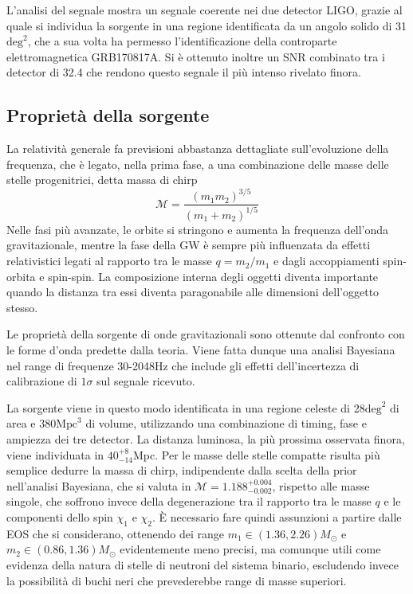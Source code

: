 L'analisi del segnale mostra un segnale coerente nei due detector LIGO, grazie al quale si individua la sorgente in una regione identificata da un angolo solido di 31 $\text{deg}^2$, che a sua volta ha permesso l'identificazione della controparte elettromagnetica GRB170817A. 
Si è ottenuto inoltre un SNR combinato tra i detector di 32.4 che rendono questo segnale il più intenso rivelato finora.\cite{Abbott_2017b}

\subsection{Proprietà della sorgente}
\label{subsection:proprietàSorgGW170817}
La relatività generale fa previsioni abbastanza dettagliate sull'evoluzione della frequenza, che è legato, nella prima fase, a una combinazione delle masse delle stelle progenitrici, detta massa di chirp 
\begin{equation}
	\mathcal{M} = \frac{(m_1m_2)^{3/5}}{(m_1+m_2)^{1/5}}
	\label{eqn:chirpmass}
\end{equation}
Nelle fasi più avanzate, le orbite si stringono e aumenta la frequenza dell'onda gravitazionale, mentre la fase della GW è sempre più influenzata da effetti relativistici legati al rapporto tra le masse $q = m_2/m_1$ e dagli accoppiamenti spin-orbita e spin-spin. 
La composizione interna degli oggetti diventa importante quando la distanza tra essi diventa paragonabile alle dimensioni dell'oggetto stesso. 

Le proprietà della sorgente di onde gravitazionali sono ottenute dal confronto con le forme d'onda predette dalla teoria. Viene fatta dunque una analisi Bayesiana nel range di frequenze 30-2048Hz che include gli effetti dell'incertezza di calibrazione di $1\sigma$ sul segnale ricevuto.

La sorgente viene in questo modo identificata in una regione celeste di 28$\text{deg}^2$ di area e $380\text{Mpc}^3$ di volume, utilizzando una combinazione di timing, fase e ampiezza dei tre detector. La distanza luminosa, la più prossima osservata finora, viene individuata in $40_{-14}^{+8}$Mpc. Per le masse delle stelle compatte risulta più semplice dedurre la massa di chirp, indipendente dalla scelta della prior nell'analisi Bayesiana, che si valuta in $\mathcal{M}=1.188_{-0.002}^{+0.004}$, rispetto alle masse singole, che soffrono invece della degenerazione tra il rapporto tra le masse $q$ e le componenti dello spin $\chi_1$ e $\chi_2$. È necessario fare quindi assunzioni a partire dalle EOS che si considerano, ottenendo dei range $m_1 \in (1.36, 2.26)M_\odot$ e $m_2 \in (0.86, 1.36)M_\odot$ evidentemente meno precisi, ma comunque utili come evidenza della natura di stelle di neutroni del sistema binario, escludendo invece la possibilità di buchi neri che prevederebbe range di masse superiori\cite{Abbott_2017b}.

